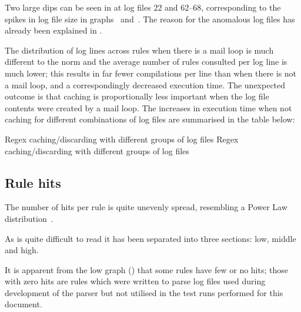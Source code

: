 

Two large dips can be seen in  at log files 22 and 62--68, corresponding to the spikes in
log file size in graphs~ and~.  The
reason for the anomalous log files has already been explained in
.

The distribution of log lines across rules when there is a mail loop is
much different to the norm and the average number of rules consulted per
log line is much lower; this results in far fewer \regex{} compilations per
line than when there is not a mail loop, and a correspondingly decreased
execution time.  The unexpected outcome is that caching \regexes{} is
proportionally less important when the log file contents were created by a
mail loop.  The increases in execution time when not caching \regexes{} for
different combinations of log files are summarised in the table below:

{Regex caching/discarding with different groups of log files}
{Regex caching/discarding with different groups of log files}


\subsection{Rule hits}
\label{rule hits}

The number of hits per rule is quite unevenly spread, resembling a Power
Law distribution~\cite{powerlaw}.


As  is quite difficult to read it has
been separated into three sections: low, middle and high.


It is apparent from the low graph ()
that some rules have few or no hits; those with zero hits are rules which
were written to parse log files used during development of the parser but
not utilised in the test runs performed for this document.

